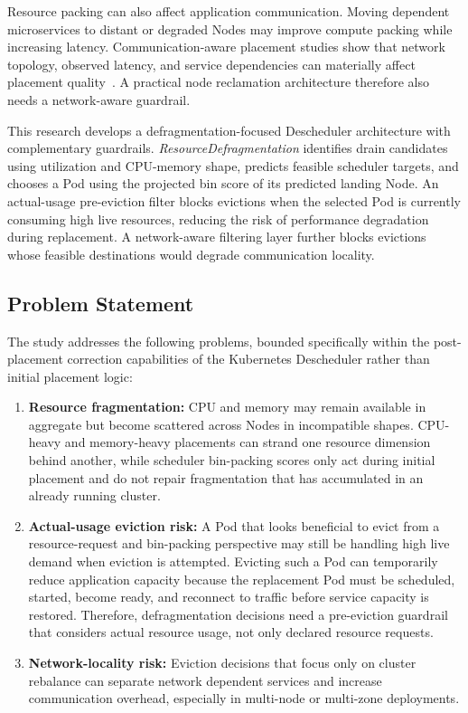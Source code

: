 Resource packing can also affect application communication. Moving dependent microservices to distant or degraded Nodes may improve compute packing while increasing latency. Communication-aware placement studies show that network topology, observed latency, and service dependencies can materially affect placement quality~\cite{marchese2022network,marchese_tomarchio_2022,chen2024trade}. A practical node reclamation architecture therefore also needs a network-aware guardrail.

This research develops a defragmentation-focused Descheduler architecture with complementary guardrails. \textit{ResourceDefragmentation} identifies drain candidates using utilization and CPU-memory shape, predicts feasible scheduler targets, and chooses a Pod using the projected bin score of its predicted landing Node. An actual-usage pre-eviction filter blocks evictions when the selected Pod is currently consuming high live resources, reducing the risk of performance degradation during replacement. A network-aware filtering layer further blocks evictions whose feasible destinations would degrade communication locality.

\subsection{Problem Statement}
\label{sec:problemStatement}

The study addresses the following problems, bounded specifically within the post-placement correction capabilities of the Kubernetes Descheduler rather than initial placement logic:

\begin{enumerate}
    \item \textbf{Resource fragmentation:} CPU and memory may remain available in aggregate but become scattered across Nodes in incompatible shapes. CPU-heavy and memory-heavy placements can strand one resource dimension behind another, while scheduler bin-packing scores only act during initial placement and do not repair fragmentation that has accumulated in an already running cluster.
    \item \textbf{Actual-usage eviction risk:} A Pod that looks beneficial to evict from a resource-request and bin-packing perspective may still be handling high live demand when eviction is attempted. Evicting such a Pod can temporarily reduce application capacity because the replacement Pod must be scheduled, started, become ready, and reconnect to traffic before service capacity is restored. Therefore, defragmentation decisions need a pre-eviction guardrail that considers actual resource usage, not only declared resource requests.
    \item \textbf{Network-locality risk:} Eviction decisions that focus only on cluster rebalance can separate network dependent services and increase communication overhead, especially in multi-node or multi-zone deployments.
\end{enumerate}


